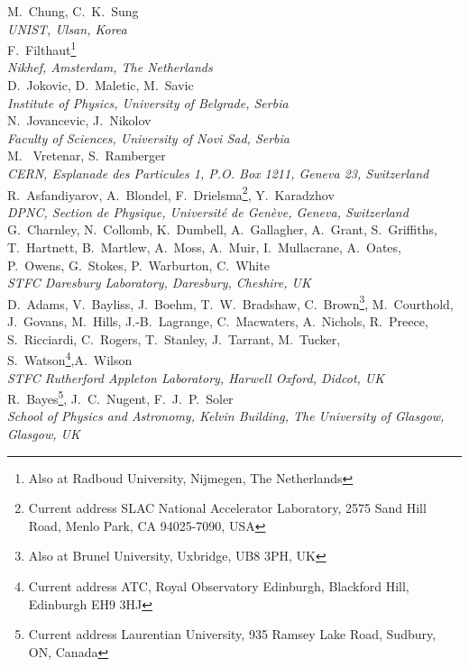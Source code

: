 M.~Chung, C.~K.~Sung
\\{\it 
UNIST, Ulsan, Korea
}\\

F.~Filthaut\footnote{Also at Radboud University, Nijmegen, The Netherlands}
\\{\it
Nikhef, Amsterdam, The Netherlands
}\\

D.~Jokovic, D.~Maletic, M.~Savic
\\{\it
Institute of Physics, University of Belgrade, Serbia
}\\

N.~Jovancevic, J.~Nikolov
\\{\it
Faculty of Sciences,  University of Novi Sad,  Serbia
}\\

M. ~Vretenar, S.~Ramberger
\\{\it
  CERN, Esplanade des Particules 1, P.O. Box 1211, Geneva 23, Switzerland
}\\

R.~Asfandiyarov, A.~Blondel, F.~Drielsma\footnote{Current address SLAC National Accelerator Laboratory, 2575 Sand Hill Road, Menlo Park, CA 94025-7090, USA}, Y.~Karadzhov 
\\{\it
DPNC, Section de Physique, Universit\'e de Gen\`eve, Geneva, Switzerland
}\\

G.~Charnley, N.~Collomb,  K.~Dumbell, A.~Gallagher, A.~Grant, S.~Griffiths,  T.~Hartnett, B.~Martlew, 
A.~Moss, A.~Muir, I.~Mullacrane, A.~Oates, P.~Owens, G.~Stokes, P.~Warburton, C.~White
\\{\it
STFC Daresbury Laboratory, Daresbury, Cheshire, UK
}\\

D.~Adams,   V.~Bayliss, J.~Boehm, T.~W.~Bradshaw, C.~Brown\footnote{Also at Brunel University, Uxbridge, UB8 3PH, UK}, M.~Courthold,  J.~Govans, M.~Hills, J.-B.~Lagrange, C.~Macwaters, A.~Nichols, R.~Preece, S.~Ricciardi, C.~Rogers, T.~Stanley, J.~Tarrant,  
M.~Tucker, S.~Watson\footnote{Current address ATC, Royal Observatory Edinburgh, Blackford Hill,  Edinburgh EH9 3HJ},A.~Wilson
\\{\it
 STFC Rutherford Appleton Laboratory, Harwell Oxford, Didcot, UK
}\\

R.~Bayes\footnote{Current address Laurentian University, 935 Ramsey Lake Road, Sudbury, ON, Canada},  J.~C.~Nugent, F.~J.~P.~Soler
\\{\it
School of Physics and Astronomy, Kelvin Building, The University of Glasgow, Glasgow, UK
}\\

